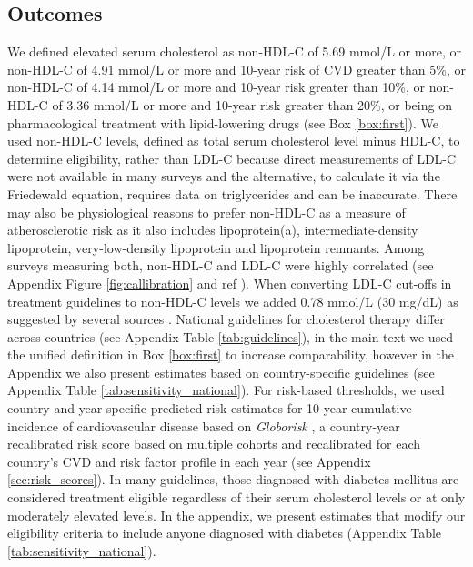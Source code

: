 \documentclass[12pt]{article}
\begin{document}
\begin{refsection}
\subsection{Outcomes}
We defined elevated serum cholesterol as non-HDL-C of 5.69 mmol/L or more, or non-HDL-C of 4.91 mmol/L or more and 10-year risk of CVD greater than 5\%, or non-HDL-C of 4.14 mmol/L or more and 10-year risk greater than 10\%, or non-HDL-C of 3.36 mmol/L or more and 10-year risk greater than 20\%, or being on pharmacological treatment with lipid-lowering drugs (see Box \ref{box:first}). We used non-HDL-C levels, defined as total serum cholesterol level minus HDL-C, to determine eligibility, rather than LDL-C because direct measurements of LDL-C were not available in many surveys and the alternative, to calculate it via the Friedewald equation, requires data on triglycerides and can be inaccurate. There may also be physiological reasons to prefer non-HDL-C as a measure of atherosclerotic risk \cite{packard_non-hdl_2004,blaha_importance_2008,ridker_nonhdl_2005, ncd_risk_factor_collaboration_ncd-risc_national_2020-1} as it also includes lipoprotein(a), intermediate-density lipoprotein, very-low-density lipoprotein and lipoprotein remnants. Among surveys measuring both, non-HDL-C and LDL-C were highly correlated (see Appendix Figure \ref{fig:callibration} and ref \cite{ncd_risk_factor_collaboration_ncd-risc_national_2020-1}). When converting LDL-C cut-offs in treatment guidelines to non-HDL-C levels we added 0.78 mmol/L (30 mg/dL) as suggested by several sources \cite{noauthor_third_2002,mach_2019_2020}. National guidelines for cholesterol therapy differ across countries (see Appendix Table \ref{tab:guidelines}), in the main text we used the unified definition in Box \ref{box:first} to increase comparability, however in the Appendix we also present estimates based on country-specific guidelines (see Appendix Table \ref{tab:sensitivity_national}). For risk-based thresholds, we used country and year-specific predicted risk estimates for 10-year cumulative incidence of cardiovascular disease based on \textit{Globorisk} \cite{hajifathalian_novel_2015,ueda_laboratory-based_2017}, a country-year recalibrated risk score based on multiple cohorts and recalibrated for each country's CVD and risk factor profile in each year (see Appendix \ref{sec:risk_scores}). In many guidelines, those diagnosed with diabetes mellitus are considered treatment eligible regardless of their serum cholesterol levels or at only moderately elevated levels. In the appendix, we present estimates that modify our eligibility criteria to include anyone diagnosed with diabetes (Appendix Table \ref{tab:sensitivity_national}). 


\end{refsection}
\end{document}

